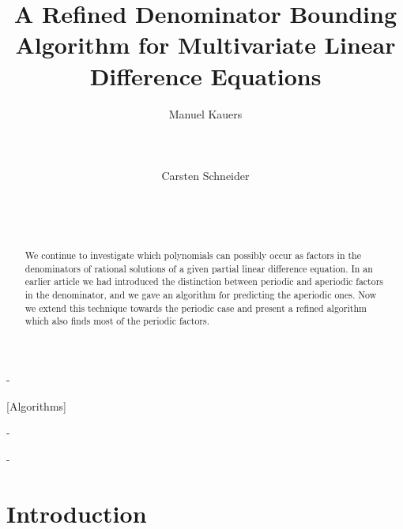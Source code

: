 \documentclass[a4paper]{sig-alternate}
\begin{document}
\title{A Refined Denominator Bounding Algorithm for Multivariate Linear Difference Equations}

\author{
 \alignauthor Manuel Kauers\\[\smallskipamount]
      \\
      \\
      \\[\smallskipamount]
 \alignauthor Carsten Schneider\\[\smallskipamount]
      \\
      \\
      \\[\smallskipamount]
}

\maketitle

\begin{abstract}
  We continue to investigate which polynomials can possibly occur as factors in the
  denominators of rational solutions of a given partial linear difference equation.
  In an earlier article we had introduced the distinction between periodic and
  aperiodic factors in the denominator, and we gave an algorithm for predicting
  the aperiodic ones. Now we extend this technique towards the periodic case
  and present a refined algorithm which also finds most of the periodic factors.
\end{abstract}

\kern-\medskipamount

[Algorithms]

\kern-\medskipamount


\kern-\medskipamount


\section{Introduction}
\end{document}
